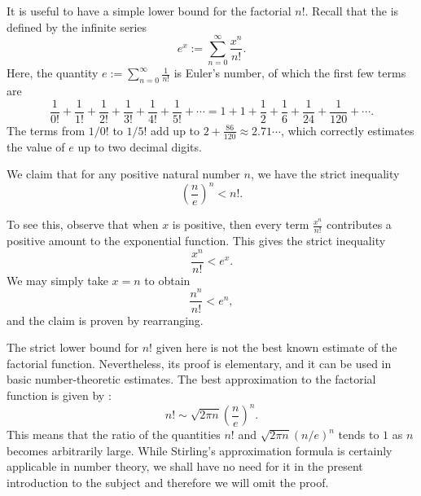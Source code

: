 \begin{remark}\label{theorem:elementary-estimate-factorial}
  It is useful to have a simple lower bound for the factorial $n!$. Recall that the  is defined by the infinite series
  \begin{equation*}
    e^x := \sum_{n=0}^\infty \frac{x^n}{n!}.
  \end{equation*}
  Here, the quantity $e:=\sum_{n=0}^\infty \frac{1}{n!}$ is Euler's number, of which the first few terms are
  \begin{equation*}
    \frac{1}{0!}+\frac{1}{1!}+\frac{1}{2!}+\frac{1}{3!}+\frac{1}{4!}+\frac{1}{5!} + \cdots = 1+1+\frac{1}{2}+\frac{1}{6}+\frac{1}{24}+\frac{1}{120}+\cdots.
  \end{equation*}
  The terms from $1/0!$ to $1/5!$ add up to $2+\frac{86}{120}\approx 2.71\cdots$, which correctly estimates the value of $e$ up to two decimal digits.
  
  We claim that for any positive natural number $n$, we have the strict inequality
  \begin{equation*}
    \left(\frac{n}{e}\right)^n<n!.
  \end{equation*}
  
  To see this, observe that when $x$ is positive, then every term $\frac{x^n}{n!}$ contributes a positive amount to the exponential function. This gives the strict inequality
  \begin{equation*}
    \frac{x^n}{n!}<e^x.
  \end{equation*}
  We may simply take $x=n$ to obtain
  \begin{equation*}
    \frac{n^n}{n!}<e^n,
  \end{equation*}
  and the claim is proven by rearranging.
  
  The strict lower bound for $n!$ given here is not the best known estimate of the factorial function. Nevertheless, its proof is elementary, and it can be used in basic number-theoretic estimates. The best approximation to the factorial function is given by :
  \begin{equation*}
    n!\sim \sqrt{2\pi n}\left(\frac{n}{e}\right)^n.
  \end{equation*}
  This means that the ratio of the quantities $n!$ and $\sqrt{2\pi n}(n/e)^n$ tends to $1$ as $n$ becomes arbitrarily large. While Stirling's approximation formula is certainly applicable in number theory, we shall have no need for it in the present introduction to the subject and therefore we will omit the proof.
\end{remark}

